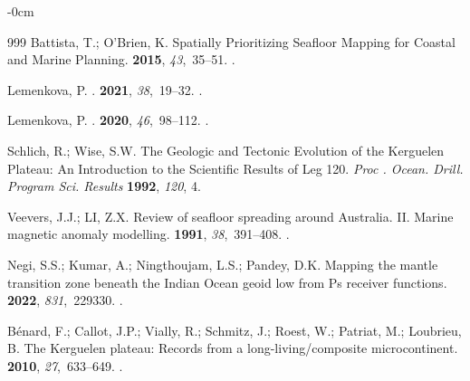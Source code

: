 \documentclass[geomatics,article,accept,pdftex,moreauthors]{Definitions/mdpi}
\begin{document}
\begin{adjustwidth}{-\extralength}{0cm}
\begin{thebibliography}{999}
Battista, T.; O’Brien, K.
\newblock Spatially Prioritizing Seafloor Mapping for Coastal and Marine
  Planning.
 {\bf 2015}, {\em 43},~35--51.
.

Lemenkova, P.
.
 {\bf 2021}, {\em 38},~19--32.
.

Lemenkova, P.
.
 {\bf 2020}, {\em 46},~98--112.
.

Schlich, R.; Wise, S.W.
\newblock The Geologic and Tectonic Evolution of the Kerguelen Plateau: An
  Introduction to the Scientific Results of Leg 120.
\newblock \emph{Proc%
. Ocean. Drill. Program Sci. Results} \textbf{1992}, \emph{120}, 4.

Veevers, J.J.; LI, Z.X.
\newblock Review of seafloor spreading around Australia. II. Marine magnetic
  anomaly modelling.
 {\bf 1991}, {\em
  38},~391--408.
.

Negi, S.S.; Kumar, A.; Ningthoujam, L.S.; Pandey, D.K.
\newblock Mapping the mantle transition zone beneath the Indian Ocean geoid low
  from Ps receiver functions.
 {\bf 2022}, {\em 831},~229330.
.

Bénard, F.; Callot, J.P.; Vially, R.; Schmitz, J.; Roest, W.; Patriat, M.;
  Loubrieu, B.
\newblock The Kerguelen plateau: Records from a long-living/composite
  microcontinent.
 {\bf 2010}, {\em 27},~633--649.
. %


\end{thebibliography}
\end{adjustwidth}
\end{document}
